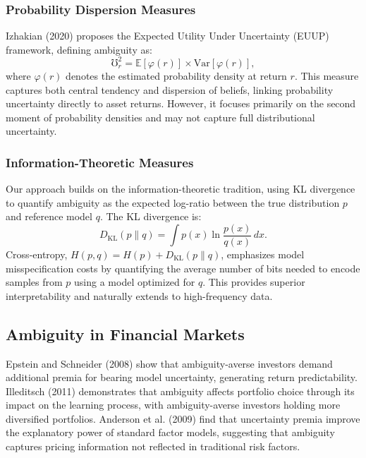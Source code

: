 \documentclass[preprint,12pt,authoryear]{elsarticle}
\begin{document}
\subsubsection{Probability Dispersion Measures}
Izhakian (2020) proposes the Expected Utility Under Uncertainty (EUUP) framework, defining ambiguity as:
\begin{equation}
\mho^2_r = \mathbb{E}[\varphi(r)] \times \mathrm{Var}[\varphi(r)],
\end{equation}
where $\varphi(r)$ denotes the estimated probability density at return $r$. This measure captures both central tendency and dispersion of beliefs, linking probability uncertainty directly to asset returns. However, it focuses primarily on the second moment of probability densities and may not capture full distributional uncertainty.

\subsubsection{Information-Theoretic Measures}
Our approach builds on the information-theoretic tradition, using KL divergence to quantify ambiguity as the expected log-ratio between the true distribution $p$ and reference model $q$. The KL divergence is:
\begin{equation}
D_{\mathrm{KL}}(p\|q)=\int p(x)\ln\frac{p(x)}{q(x)}\,dx.
\end{equation}
Cross-entropy, $H(p,q)=H(p)+D_{\mathrm{KL}}(p\|q)$, emphasizes model misspecification costs by quantifying the average number of bits needed to encode samples from $p$ using a model optimized for $q$. This provides superior interpretability and naturally extends to high-frequency data.

\subsection{Ambiguity in Financial Markets}

Epstein and Schneider (2008) show that ambiguity-averse investors demand additional premia for bearing model uncertainty, generating return predictability. Illeditsch (2011) demonstrates that ambiguity affects portfolio choice through its impact on the learning process, with ambiguity-averse investors holding more diversified portfolios. Anderson et al. (2009) find that uncertainty premia improve the explanatory power of standard factor models, suggesting that ambiguity captures pricing information not reflected in traditional risk factors.
\end{document}
